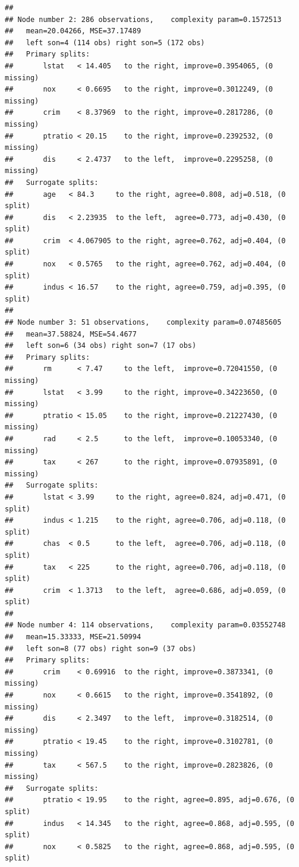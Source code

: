 \documentclass[
]{book}
\theoremstyle{plain}
\theoremstyle{definition}
\theoremstyle{definition}
\theoremstyle{definition}
\theoremstyle{definition}
\theoremstyle{remark}
\begin{document}
\begin{verbatim}
## 
## Node number 2: 286 observations,    complexity param=0.1572513
##   mean=20.04266, MSE=37.17489 
##   left son=4 (114 obs) right son=5 (172 obs)
##   Primary splits:
##       lstat   < 14.405   to the right, improve=0.3954065, (0 missing)
##       nox     < 0.6695   to the right, improve=0.3012249, (0 missing)
##       crim    < 8.37969  to the right, improve=0.2817286, (0 missing)
##       ptratio < 20.15    to the right, improve=0.2392532, (0 missing)
##       dis     < 2.4737   to the left,  improve=0.2295258, (0 missing)
##   Surrogate splits:
##       age   < 84.3     to the right, agree=0.808, adj=0.518, (0 split)
##       dis   < 2.23935  to the left,  agree=0.773, adj=0.430, (0 split)
##       crim  < 4.067905 to the right, agree=0.762, adj=0.404, (0 split)
##       nox   < 0.5765   to the right, agree=0.762, adj=0.404, (0 split)
##       indus < 16.57    to the right, agree=0.759, adj=0.395, (0 split)
## 
## Node number 3: 51 observations,    complexity param=0.07485605
##   mean=37.58824, MSE=54.4677 
##   left son=6 (34 obs) right son=7 (17 obs)
##   Primary splits:
##       rm      < 7.47     to the left,  improve=0.72041550, (0 missing)
##       lstat   < 3.99     to the right, improve=0.34223650, (0 missing)
##       ptratio < 15.05    to the right, improve=0.21227430, (0 missing)
##       rad     < 2.5      to the left,  improve=0.10053340, (0 missing)
##       tax     < 267      to the right, improve=0.07935891, (0 missing)
##   Surrogate splits:
##       lstat < 3.99     to the right, agree=0.824, adj=0.471, (0 split)
##       indus < 1.215    to the right, agree=0.706, adj=0.118, (0 split)
##       chas  < 0.5      to the left,  agree=0.706, adj=0.118, (0 split)
##       tax   < 225      to the right, agree=0.706, adj=0.118, (0 split)
##       crim  < 1.3713   to the left,  agree=0.686, adj=0.059, (0 split)
## 
## Node number 4: 114 observations,    complexity param=0.03552748
##   mean=15.33333, MSE=21.50994 
##   left son=8 (77 obs) right son=9 (37 obs)
##   Primary splits:
##       crim    < 0.69916  to the right, improve=0.3873341, (0 missing)
##       nox     < 0.6615   to the right, improve=0.3541892, (0 missing)
##       dis     < 2.3497   to the left,  improve=0.3182514, (0 missing)
##       ptratio < 19.45    to the right, improve=0.3102781, (0 missing)
##       tax     < 567.5    to the right, improve=0.2823826, (0 missing)
##   Surrogate splits:
##       ptratio < 19.95    to the right, agree=0.895, adj=0.676, (0 split)
##       indus   < 14.345   to the right, agree=0.868, adj=0.595, (0 split)
##       nox     < 0.5825   to the right, agree=0.868, adj=0.595, (0 split)

\end{verbatim}
\end{document}
